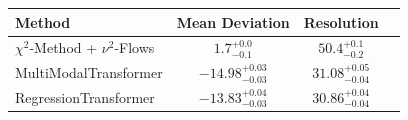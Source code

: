     \begin{tabular}{lccc}
        \toprule
        Method & Mean Deviation & Resolution \\
        \midrule
        $\chi^2$-Method + $\nu^2$-Flows & $1.7_{-0.1}^{+0.0}$ & $50.4_{-0.2}^{+0.1}$ \\
        MultiModalTransformer & $-14.98_{-0.03}^{+0.03}$ & $31.08_{-0.04}^{+0.05}$ \\
        RegressionTransformer & $-13.83_{-0.03}^{+0.04}$ & $30.86_{-0.04}^{+0.04}$ \\
        \bottomrule
    \end{tabular}